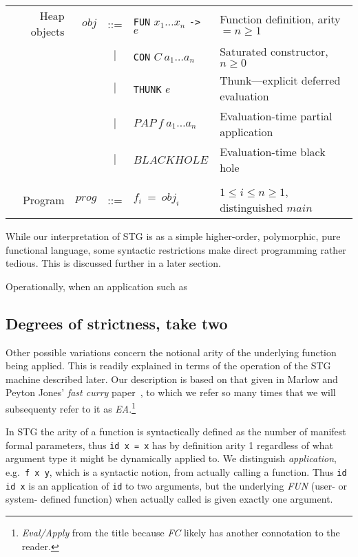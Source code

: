 \documentclass{llncs}
\begin{document}
\begin{table}
\begin{tabular}{r r c l l}
\\
Heap objects & $\mathit{obj}$ & ::= &\texttt{FUN} $x_1\dots x_n$ \texttt{->} $e$   & Function definition, arity $=n\ge 1$ \\
             &                & $|$ &\texttt{CON} $C\ a_1\dots a_n$                & Saturated constructor, $n \ge 0$ \\
             &                & $|$ &\texttt{THUNK} $e$                            & Thunk---explicit deferred evaluation \\
             &                & $|$ & $\mathit{PAP}\ f\ a_1\dots a_n$               & Evaluation-time partial application \\
             &                & $|$ & $\mathit{BLACKHOLE}$                         & Evaluation-time black hole \\
\\
Program      & $\mathit{prog}$& ::= & $f_i\ =\ \mathit{obj}_i$                      & $1\le i \le n \ge 1$, distinguished $\mathit{main}$ \\

\end{tabular}
\end{table}

While our interpretation of STG is as a simple higher-order, polymorphic, pure
functional language, some syntactic restrictions make direct programming
rather tedious.  This is discussed further in a later section.

Operationally, when an application such as

\subsection{Degrees of strictness, take two}

Other possible variations concern the notional arity of the underlying
function being applied.  This is readily explained in terms of the operation
of the STG machine described later.  Our description is based on that given in
Marlow and Peyton Jones' \emph{fast curry} paper~\cite{fastcurry}, to which we
refer so many times that we will subsequenty refer to it as
\emph{EA}.\footnote{\emph{Eval/Apply} from the title because \emph{FC} likely
  has another connotation to the reader.}

In STG the arity of a function is syntactically defined as the number of
manifest formal parameters, thus \texttt{id x = x} has by definition arity 1
regardless of what argument type it might be dynamically applied to.  We
distinguish \emph{application}, e.g.\ \texttt{f x y}, which is a syntactic
notion, from actually calling a function. Thus \texttt{id id x} is an
application of \texttt{id} to two arguments, but the underlying \emph{FUN}
(user- or system- defined function) when actually called is given exactly one
argument.
\end{document}
